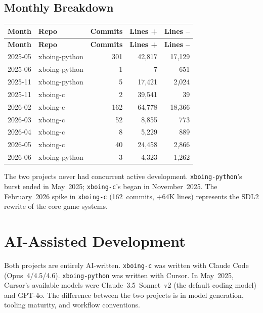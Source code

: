 \documentclass[a4paper,10pt]{article}
\newcommand{\repo}[1]{\texttt{#1}}
\begin{document}
\subsection{Monthly Breakdown}

\begin{longtable}{@{}llrrr@{}}
\toprule
\textbf{Month} & \textbf{Repo} & \textbf{Commits} &
  \textbf{Lines +} & \textbf{Lines --} \\
\midrule
\endfirsthead
\toprule
\textbf{Month} & \textbf{Repo} & \textbf{Commits} &
  \textbf{Lines +} & \textbf{Lines --} \\
\midrule
\endhead
2025-05 & xboing-python & 301 & 42,817 & 17,129 \\
2025-06 & xboing-python & 1 & 7 & 651 \\
\midrule
2025-11 & xboing-python & 5 & 17,421 & 2,024 \\
2025-11 & xboing-c & 2 & 39,541 & 39 \\
\midrule
2026-02 & xboing-c & 162 & 64,778 & 18,366 \\
2026-03 & xboing-c & 52 & 8,855 & 773 \\
2026-04 & xboing-c & 8 & 5,229 & 889 \\
2026-05 & xboing-c & 40 & 24,458 & 2,866 \\
\midrule
2026-06 & xboing-python & 3 & 4,323 & 1,262 \\
\bottomrule
\end{longtable}

The two projects never had concurrent active development.
\repo{xboing-python}'s burst ended in May~2025; \repo{xboing-c}'s
began in November~2025.  The February~2026 spike in \repo{xboing-c}
(162~commits, +64K lines) represents the SDL2 rewrite of the core
game systems.

\section{AI-Assisted Development}

Both projects are entirely AI-written.  \repo{xboing-c} was written with Claude Code (Opus~4/4.5/4.6).
\repo{xboing-python} was written with Cursor.  In May~2025,
Cursor's available models were Claude~3.5~Sonnet~v2 (the default
coding model) and GPT-4o.  The difference between the two projects
is in model generation, tooling maturity, and workflow conventions.
\end{document}

